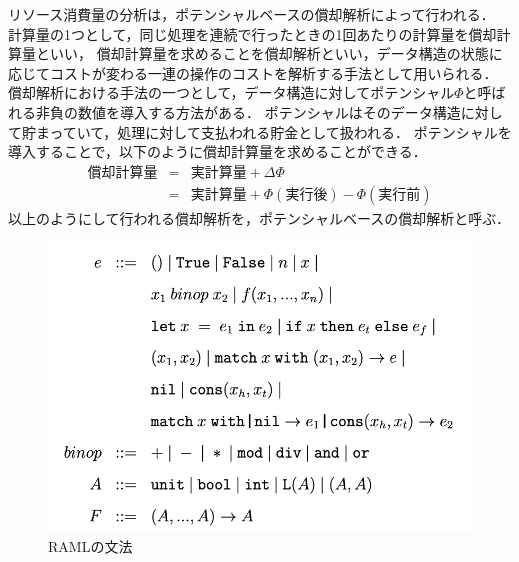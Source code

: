 \documentclass{kuisthesis}
\begin{document}
リソース消費量の分析は，ポテンシャルベースの償却解析によって行われる\cite{amortized}．
計算量の1つとして，同じ処理を連続で行ったときの1回あたりの計算量を償却計算量といい，
償却計算量を求めることを償却解析といい，データ構造の状態に応じてコストが変わる一連の操作のコストを解析する手法として用いられる．
償却解析における手法の一つとして，データ構造に対してポテンシャル$\Phi$と呼ばれる非負の数値を導入する方法がある．
ポテンシャルはそのデータ構造に対して貯まっていて，処理に対して支払われる貯金として扱われる．
ポテンシャルを導入することで，以下のように償却計算量を求めることができる．
\begin{eqnarray*}
  \mbox{償却計算量}&=&\mbox{実計算量}+\Delta \Phi \\
  &=&\mbox{実計算量}+\Phi (\mbox{実行後})-\Phi(\mbox{実行前})
\end{eqnarray*}
以上のようにして行われる償却解析を，ポテンシャルベースの償却解析と呼ぶ．


\begin{figure}[ht]
  \begin{center}
    \includegraphics[scale=0.8]{image2.png}
    \caption{RAMLの文法}
    \label{image2}
  \end{center}
\end{figure}

\end{document}
